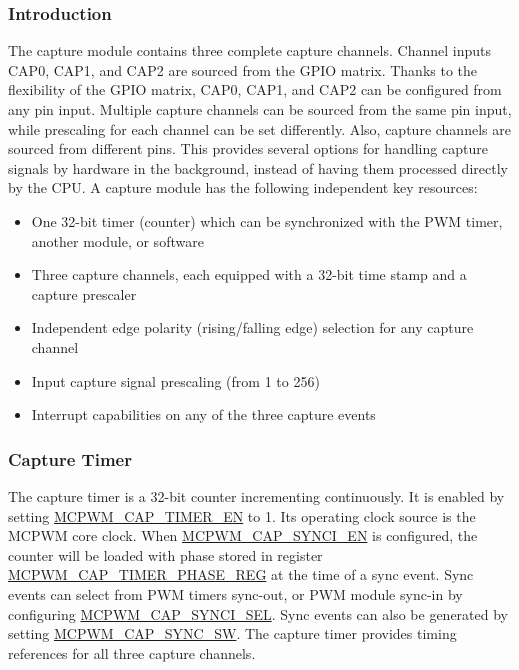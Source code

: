 \documentclass[main\_\_EN.tex]{subfiles}
\begin{document}
\subsubsection{Introduction}
The capture module contains three complete capture channels. Channel inputs CAP0, CAP1, and CAP2 are sourced from the GPIO matrix. Thanks to the flexibility of the GPIO matrix, CAP0, CAP1, and CAP2 can be configured from any pin input. Multiple capture channels can be sourced from the same pin input, while prescaling for each channel can be set differently. Also, capture channels are sourced from different pins. This provides several options for handling capture signals by hardware in the background, instead of having them processed directly by the CPU. 
A capture module has the following independent key resources:
\begin{itemize}
    \item One 32-bit timer (counter) which can be synchronized with the PWM timer, another module, or software
    \item Three capture channels, each equipped with a 32-bit time stamp and a capture prescaler
    \item Independent edge polarity (rising/falling edge) selection for any capture channel
    \item Input capture signal prescaling (from 1 to 256)
    \item Interrupt capabilities on any of the three capture events
\end{itemize}

\subsubsection{Capture Timer}
The capture timer is a 32-bit counter incrementing continuously. It is enabled by setting \hyperref[fielddesc:MCPWMCAPTIMEREN]{MCPWM\_CAP\_TIMER\_EN} to 1. Its operating clock source is the MCPWM core clock. When \hyperref[fielddesc:MCPWMCAPSYNCIEN]{MCPWM\_CAP\_SYNCI\_EN} is configured, the counter will be loaded with phase stored in register\\\hyperref[regdesc:MCPWMCAPTIMERPHASEREG]{MCPWM\_CAP\_TIMER\_PHASE\_REG} at the time of a sync event. Sync events can select from PWM timers sync-out, or PWM module sync-in by configuring \hyperref[fielddesc:MCPWMCAPSYNCISEL]{MCPWM\_CAP\_SYNCI\_SEL}. Sync events can also be generated by setting \hyperref[fielddesc:MCPWMCAPSYNCSW]{MCPWM\_CAP\_SYNC\_SW}. The capture timer provides timing references for all three capture channels.
\end{document}
